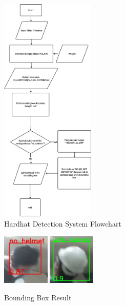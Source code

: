 \begin{figure} [ht]
  \centering
  \includegraphics[width=0.4\textwidth]{gambar/utilities/sistemhedect.drawio.png}

  \caption{Hardhat Detection System Flowchart}
  \label{fig:flowchart_sistem}
\end{figure}

\begin{figure} [ht]
  \centering
  \includegraphics[width=0.2\textwidth]{gambar/utilities/bbox1.png}
  \includegraphics[width=0.2\textwidth]{gambar/utilities/bbox2.png}

  \caption{Bounding Box Result}
  \label{fig:bboxresult}
\end{figure}



